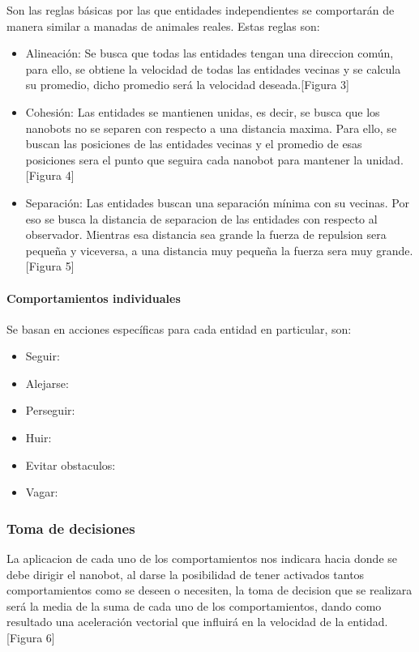 Son las reglas básicas por las que entidades independientes se comportarán de manera similar a manadas de animales reales. Estas reglas son:
\begin{itemize}
 \item Alineación: Se busca que todas las entidades tengan una direccion común, para ello, se obtiene la velocidad de todas las entidades vecinas y se calcula su promedio, dicho promedio será la velocidad deseada.[Figura 3]
 \item Cohesión: Las entidades se mantienen unidas, es decir, se busca que los nanobots no se separen con respecto a una distancia maxima. Para ello, se buscan las posiciones de las entidades vecinas y el promedio de esas posiciones sera el punto que seguira cada nanobot para mantener la unidad. [Figura 4]
 \item Separación: Las entidades buscan una separación mínima con su vecinas. Por eso se busca la distancia de separacion de las entidades con respecto al observador. Mientras esa distancia sea grande la fuerza de repulsion sera pequeña y viceversa, a una distancia muy pequeña la fuerza sera muy grande. [Figura 5]
\end{itemize}

\paragraph{Comportamientos individuales}
Se basan en acciones específicas para cada entidad en particular, son:  
\begin{itemize}
 \item Seguir: 
 \item Alejarse:
 \item Perseguir:
 \item Huir:
 \item Evitar obstaculos:
 \item Vagar:
\end{itemize}

\subsubsection{Toma de decisiones}
\label{sec:toma_decisiones}
La aplicacion de cada uno de los comportamientos nos indicara hacia donde se debe dirigir el nanobot, al darse la posibilidad de  tener activados tantos comportamientos como se deseen o necesiten, la toma de decision que se realizara será la media de la suma de cada uno de los comportamientos, dando como resultado una aceleración vectorial que influirá en la velocidad de la entidad. [Figura 6]


